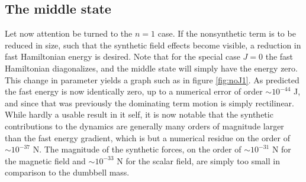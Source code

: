 \documentclass[main.tex]{subfiles}
\begin{document}
\subsection{The middle state}\label{sec:resmiddle}
Let now attention be turned to the \(n = 1 \) case. If the nonsynthetic term is to be
reduced in size, such that the synthetic field effects become visible, a reduction in fast
Hamiltonian energy is desired. Note that for the special case \(J = 0\) the fast
Hamiltonian diagonalizes, and the middle state will simply have the energy zero. This
change in parameter yields a graph such as in figure \ref{fig:noJ1}. As predicted the fast
energy is now identically zero, up to a numerical error of order \(\sim 10^{-44}\) J, and since that was previously the dominating term motion is
simply rectilinear. While hardly a usable result in it self, it is now notable that the
synthetic contributions to the dynamics are generally many orders of magnitude larger than the
fast energy gradient, which is but a numerical residue on the order of \(\sim 10^{-37}\) N.
The magnitude of the synthetic forces, on the order of \(\sim 10^{-31}\) N for the magnetic
field
and \(\sim 10^{-33}\) N for the scalar field, are simply too small in comparison to the
dumbbell mass.
\end{document}
